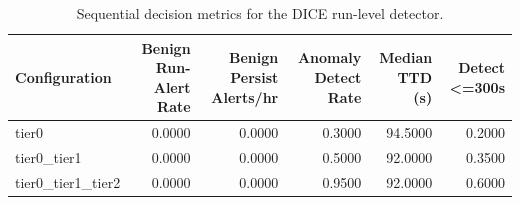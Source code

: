 \begin{table}[t]
\centering
\caption{Sequential decision metrics for the DICE run-level detector.}
\label{tab:dice_sequential_metrics}
\footnotesize
\begin{tabular}{lrrrrr}
\toprule
Configuration & Benign Run-Alert Rate & Benign Persist Alerts/hr & Anomaly Detect Rate & Median TTD (s) & Detect <=300s \\
\midrule
tier0 & 0.0000 & 0.0000 & 0.3000 & 94.5000 & 0.2000 \\
tier0_tier1 & 0.0000 & 0.0000 & 0.5000 & 92.0000 & 0.3500 \\
tier0_tier1_tier2 & 0.0000 & 0.0000 & 0.9500 & 92.0000 & 0.6000 \\
\bottomrule
\end{tabular}

\end{table}
